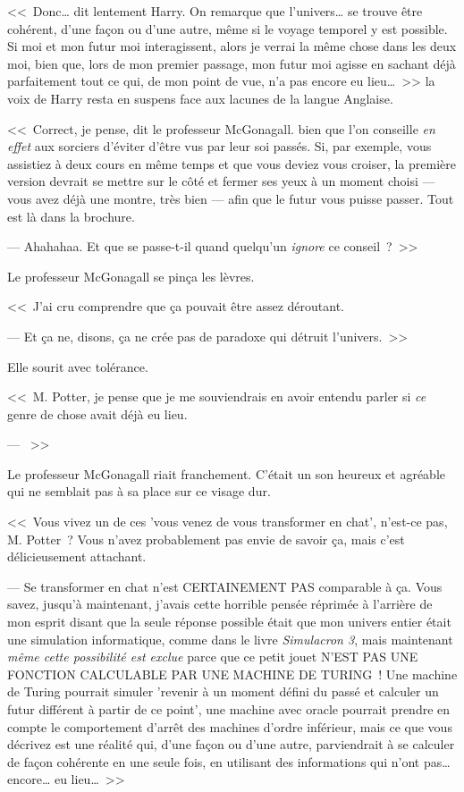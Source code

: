 <<~Donc… dit lentement Harry. On remarque que l'univers… se trouve être cohérent, d'une façon ou d'une autre, même si le voyage temporel y est possible. Si moi et mon futur moi interagissent, alors je verrai la même chose dans les deux moi, bien que, lors de mon premier passage, mon futur moi agisse en sachant déjà parfaitement tout ce qui, de mon point de vue, n'a pas encore eu lieu…~>> la voix de Harry resta en suspens face aux lacunes de la langue Anglaise.

<<~Correct, je pense, dit le professeur McGonagall. bien que l'on conseille \emph{en effet} aux sorciers d'éviter d'être vus par leur soi passés. Si, par exemple, vous assistiez à deux cours en même temps et que vous deviez vous croiser, la première version devrait se mettre sur le côté et fermer ses yeux à un moment choisi — vous avez déjà une montre, très bien — afin que le futur vous puisse passer. Tout est là dans la brochure.

--- Ahahahaa. Et que se passe-t-il quand quelqu'un \emph{ignore} ce conseil~?~>>

Le professeur McGonagall se pinça les lèvres.

<<~J'ai cru comprendre que ça pouvait être assez déroutant.

--- Et ça ne, disons, ça ne crée pas de paradoxe qui détruit l'univers.~>>

Elle sourit avec tolérance.

<<~M. Potter, je pense que je me souviendrais en avoir entendu parler si \emph{ce} genre de chose avait déjà eu lieu.

--- ~>>

Le professeur McGonagall riait franchement. C'était un son heureux et agréable qui ne semblait pas à sa place sur ce visage dur.

<<~Vous vivez un de ces 'vous venez de vous transformer en chat', n'est-ce pas, M. Potter~? Vous n'avez probablement pas envie de savoir ça, mais c'est délicieusement attachant.

--- Se transformer en chat n'est CERTAINEMENT PAS comparable à ça. Vous savez, jusqu'à maintenant, j'avais cette horrible pensée réprimée à l'arrière de mon esprit disant que la seule réponse possible était que mon univers entier était une simulation informatique, comme dans le livre \emph{Simulacron 3}, mais maintenant \emph{même cette possibilité est exclue} parce que ce petit jouet N'EST PAS UNE FONCTION CALCULABLE PAR UNE MACHINE DE TURING~! Une machine de Turing pourrait simuler 'revenir à un moment défini du passé et calculer un futur différent à partir de ce point', une machine avec oracle pourrait prendre en compte le comportement d'arrêt des machines d'ordre inférieur, mais ce que vous décrivez est une réalité qui, d'une façon ou d'une autre, parviendrait à se calculer de façon cohérente en une seule fois, en utilisant des informations qui n'ont pas… encore… eu lieu…~>>

